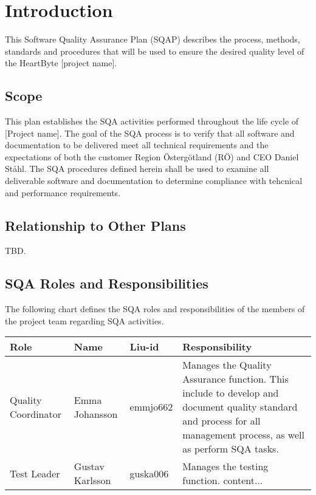 \documentclass{article}
\begin{document}
	
	\clearpage
	
	
	\clearpage
	
	\tableofcontents
	\clearpage
	
	\section{Introduction}
	This Software Quality Assurance Plan (SQAP) describes the process, methods, standards and procedures that will be used to ensure the desired quality level of the HeartByte [project name].
	
	\subsection{Scope}
	This plan establishes the SQA activities performed throughout the life cycle of [Project name]. The goal of the SQA process is to verify that all software and documentation to be delivered meet all technical requirements and the expectations of both the customer Region Östergötland (RÖ) and CEO Daniel Ståhl. The SQA procedures defined herein shall be used to examine all deliverable software and documentation to determine compliance with tehcnical and performance requirements. 
	
	
	\subsection{Relationship to Other Plans}
	TBD.
	
	\subsection{SQA Roles and Responsibilities}
	The following chart defines the SQA roles and responsibilities of the members of the project team regarding SQA activities.
	
	\begin{tabular}{|l|l|l|l|}
		\hline
		Role & Name & Liu-id & Responsibility \\
		\hline
		Quality Coordinator & Emma Johansson & emmjo662 & Manages the Quality Assurance function. This include to develop and document quality standard and process for all management process, as well as perform SQA tasks. \\
		
		Test Leader & Gustav Karlsson & guska006 & Manages the testing function.
		content...
	\end{tabular}
	
\end{document}
